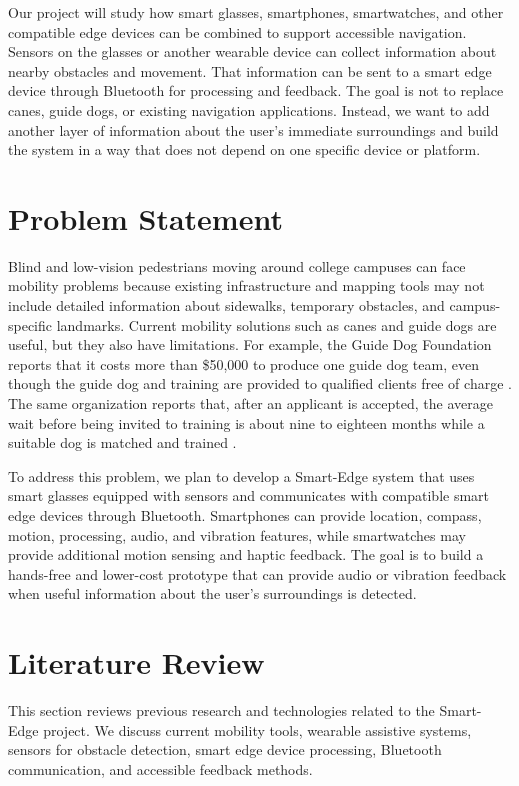 \documentclass[12pt,letterpaper,oneside,reqno]{book}
\theoremstyle{plain}
\theoremstyle{definition}
\theoremstyle{plain}
\theoremstyle{remark}
\theoremstyle{plain}
\theoremstyle{definition}
\theoremstyle{plain}
\begin{document}
Our project will study how smart glasses, smartphones, smartwatches, and other compatible edge devices can be combined to support accessible navigation. Sensors on the glasses or another wearable device can collect information about nearby obstacles and movement. That information can be sent to a smart edge device through Bluetooth for processing and feedback. The goal is not to replace canes, guide dogs, or existing navigation applications. Instead, we want to add another layer of information about the user's immediate surroundings and build the system in a way that does not depend on one specific device or platform.

\section{Problem Statement}
Blind and low-vision pedestrians moving around college campuses can face mobility problems because existing infrastructure and mapping tools may not include detailed information about sidewalks, temporary obstacles, and campus-specific landmarks. Current mobility solutions such as canes and guide dogs are useful, but they also have limitations. For example, the Guide Dog Foundation reports that it costs more than \$50,000 to produce one guide dog team, even though the guide dog and training are provided to qualified clients free of charge \cite{GuideDogFAQ2026}. The same organization reports that, after an applicant is accepted, the average wait before being invited to training is about nine to eighteen months while a suitable dog is matched and trained \cite{GuideDogFoundation2026}.

To address this problem, we plan to develop a Smart-Edge system that uses smart glasses equipped with sensors and communicates with compatible smart edge devices through Bluetooth. Smartphones can provide location, compass, motion, processing, audio, and vibration features, while smartwatches may provide additional motion sensing and haptic feedback. The goal is to build a hands-free and lower-cost prototype that can provide audio or vibration feedback when useful information about the user's surroundings is detected.

\section{Literature Review}
This section reviews previous research and technologies related to the Smart-Edge project. We discuss current mobility tools, wearable assistive systems, sensors for obstacle detection, smart edge device processing, Bluetooth communication, and accessible feedback methods.
\end{document}
